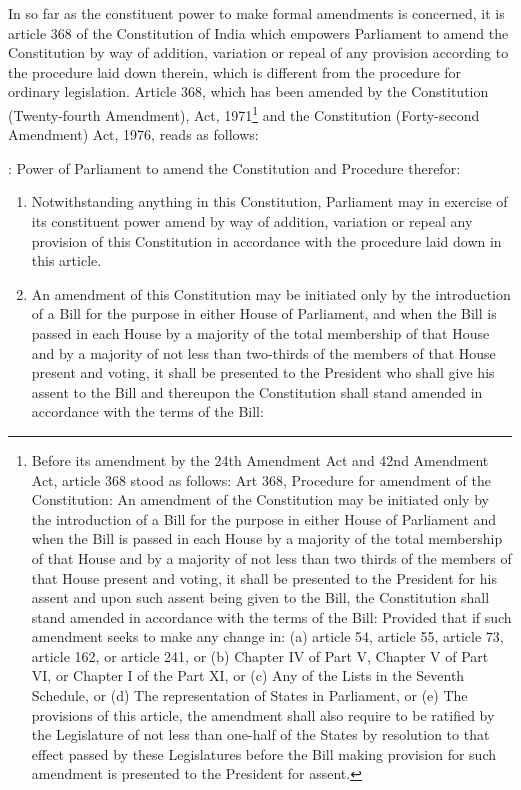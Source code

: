 \begin{multicols}{2}
\noi
In so far as the constituent power to make formal amendments is concerned, it is article 368
of the Constitution of India which empowers Parliament to amend the Constitution by way of
addition, variation or repeal of any provision according to the procedure laid down therein,
which is different from the procedure for ordinary legislation. Article 368, which has been
amended by the Constitution (Twenty-fourth Amendment), Act, 1971\footnote{Before its amendment by the 24th Amendment Act and 42nd Amendment Act, article 368 stood as follows: Art 368, Procedure for amendment of the Constitution: An amendment of the Constitution may be initiated only by the introduction of a Bill for the purpose in either House of Parliament and when the Bill is passed in each House by a majority of the total membership of that House and by a majority of not less than two thirds of the members of that House present and voting, it shall be presented to the President for his assent and upon such assent being
given to the Bill, the Constitution shall stand amended in accordance with the terms of the Bill: Provided that if
such amendment seeks to make any change in: (a) article 54, article 55, article 73, article 162, or article 241, or
(b) Chapter IV of Part V, Chapter V of Part VI, or Chapter I of the Part XI, or (c) Any of the Lists in the Seventh
Schedule, or (d) The representation of States in Parliament, or (e) The provisions of this article, the amendment shall also require to be ratified by the Legislature of not less than one-half of the States by resolution to that effect
passed by these Legislatures before the Bill making provision for such amendment is presented to the President
for assent.} and the Constitution (Forty-second Amendment) Act, 1976, reads as follows:

 : Power of Parliament to amend the Constitution and Procedure therefor:

\begin{enumerate}
\item Notwithstanding anything in this Constitution, Parliament may in exercise of its constituent
power amend by way of addition, variation or repeal any provision of this Constitution in
accordance with the procedure laid down in this article.

\item  An amendment of this Constitution may be initiated only by the introduction of a Bill for
the purpose in either House of Parliament, and when the Bill is passed in each House by a
majority of the total membership of that House and by a majority of not less than two-thirds
of the members of that House present and voting, it shall be presented to the President who
shall give his assent to the Bill and thereupon the Constitution shall stand amended in
accordance with the terms of the Bill:


\end{enumerate}
\end{multicols}
